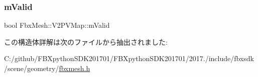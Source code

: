 \mbox{\label{struct_fbx_mesh_1_1_v2_p_v_map_a23599f521bff9cdaf5da7c5ee403b0cc}} 
\subsubsection{\texorpdfstring{m\+Valid}{mValid}}
{\footnotesize\ttfamily bool Fbx\+Mesh\+::\+V2\+P\+V\+Map\+::m\+Valid}



この構造体詳解は次のファイルから抽出されました\+:\begin{DoxyCompactItemize}
\item 
C\+:/github/\+F\+B\+Xpython\+S\+D\+K201701/\+F\+B\+Xpython\+S\+D\+K201701/2017./include/fbxsdk/scene/geometry/\hyperlink{fbxmesh_8h}{fbxmesh.\+h}\end{DoxyCompactItemize}
